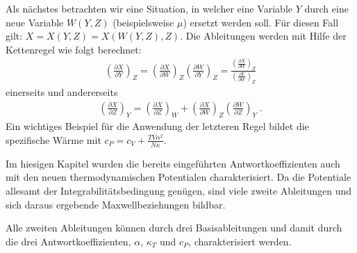 Als nächstes betrachten wir eine Situation, in welcher eine Variable $Y$ durch eine neue Variable $W(Y,Z)$ (beispielsweise $\mu$) ersetzt werden soll.
Für diesen Fall gilt: $X=X(Y,Z)=X(W(Y,Z),Z)$. 	
Die Ableitungen werden mit Hilfe der Kettenregel wie folgt berechnet:
\begin{align*}
	\boxed{\left(\frac{\partial X}{\partial Y}\right)_Z=\left(\frac{\partial X}{\partial W}\right)_Z\left(\frac{\partial W}{\partial Y}\right)_Z=\frac{\left(\frac{\partial X}{\partial W}\right)_Z}{\left(\frac{\partial Y}{\partial W}\right)_Z}}
\end{align*}
einerseits und andererseits
\begin{align*}
	\boxed{\left(\frac{\partial X}{\partial Z}\right)_Y=\left(\frac{\partial X}{\partial Z}\right)_W+\left(\frac{\partial X}{\partial W}\right)_Z\left(\frac{\partial W}{\partial Z}\right)_Y}\;.
\end{align*}
Ein wichtiges Beispiel für die Anwendung der letzteren Regel bildet die spezifische Wärme mit $c_P=c_V+\frac{TV\alpha^2}{N\kappa}$.
\begin{summary}
	Im hiesigen Kapitel wurden die bereits eingeführten Antwortkoeffizienten auch mit den neuen thermodynamischen Potentialen charakterisiert. Da die Potentiale allesamt der Integrabilitätsbedingung genügen, sind viele zweite Ableitungen und sich daraus ergebende Maxwellbeziehungen bildbar.

	Alle zweiten Ableitungen können durch drei Basisableitungen und damit durch die drei Antwortkoeffizienten, $\alpha$, $\kappa_T$ und $c_P$, charakterisiert werden.
\end{summary}